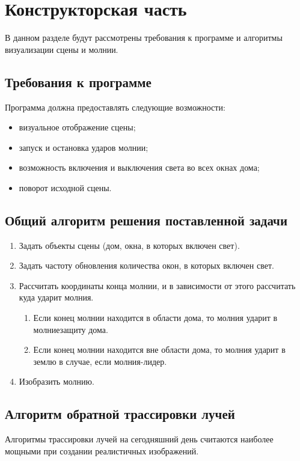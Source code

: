 \chapter{Конструкторская часть}
В данном разделе будут рассмотрены требования к программе и алгоритмы визуализации сцены и молнии.


\section{Требования к программе}
Программа должна предоставлять следующие возможности:
\begin{itemize}
	\item визуальное отображение сцены;
	\item запуск и остановка ударов молнии;
	\item возможность включения и выключения света во всех окнах дома;
	\item поворот исходной сцены.
\end{itemize}


\section{Общий алгоритм решения поставленной задачи}
\begin{enumerate}
	\item Задать объекты сцены (дом, окна, в которых включен свет).
	\item Задать частоту обновления количества окон, в которых включен свет.
	\item Рассчитать координаты конца молнии, и в зависимости от этого рассчитать куда ударит молния.
	\begin{enumerate}
		\item Если конец молнии находится в области дома, то молния ударит в молниезащиту дома.
		\item Если конец молнии находится вне области дома, то молния ударит в землю в случае, если молния-лидер.
	\end{enumerate}
	\item Изобразить молнию.
\end{enumerate}


\section{Алгоритм обратной трассировки лучей}

Алгоритмы трассировки лучей на сегодняшний день считаются наиболее мощными при создании реалистичных изображений. 

